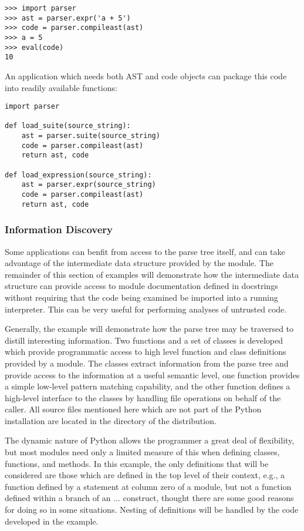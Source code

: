 \begin{verbatim}
>>> import parser
>>> ast = parser.expr('a + 5')
>>> code = parser.compileast(ast)
>>> a = 5
>>> eval(code)
10
\end{verbatim}

An application which needs both AST and code objects can package this
code into readily available functions:

\begin{verbatim}
import parser

def load_suite(source_string):
    ast = parser.suite(source_string)
    code = parser.compileast(ast)
    return ast, code

def load_expression(source_string):
    ast = parser.expr(source_string)
    code = parser.compileast(ast)
    return ast, code
\end{verbatim}

\subsubsection{Information Discovery}

Some applications can benfit from access to the parse tree itself, and
can take advantage of the intermediate data structure provided by the
 module.  The remainder of this section of examples will
demonstrate how the intermediate data structure can provide access to
module documentation defined in docstrings without requiring that the
code being examined be imported into a running interpreter.  This can
be very useful for performing analyses of untrusted code.

Generally, the example will demonstrate how the parse tree may be
traversed to distill interesting information.  Two functions and a set
of classes is developed which provide programmatic access to high
level function and class definitions provided by a module.  The
classes extract information from the parse tree and provide access to
the information at a useful semantic level, one function provides a
simple low-level pattern matching capability, and the other function
defines a high-level interface to the classes by handling file
operations on behalf of the caller.  All source files mentioned here
which are not part of the Python installation are located in the
 directory of the distribution.

The dynamic nature of Python allows the programmer a great deal of
flexibility, but most modules need only a limited measure of this when
defining classes, functions, and methods.  In this example, the only
definitions that will be considered are those which are defined in the
top level of their context, e.g., a function defined by a 
statement at column zero of a module, but not a function defined
within a branch of an  ...  construct, thought
there are some good reasons for doing so in some situations.  Nesting
of definitions will be handled by the code developed in the example.

